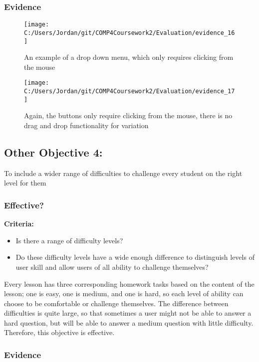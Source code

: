 \subsubsection{Evidence}

\begin{figure}[H]
	\texttt{[image: C:/Users/Jordan/git/COMP4Coursework2/Evaluation/evidence\_16]}
	\caption{An example of a drop down menu, which only requires clicking from the mouse}
\end{figure}

\begin{figure}[H]
	\texttt{[image: C:/Users/Jordan/git/COMP4Coursework2/Evaluation/evidence\_17]}
	\caption{Again, the buttons only require clicking from the mouse, there is no drag and drop functionality for variation}
\end{figure}

\subsection{Other Objective 4: }

To include a wider range of difficulties to challenge every student on the right level for them

\subsubsection{Effective?}

\textbf{Criteria: }

\begin{itemize}
	\item Is there a range of difficulty levels?
	\item Do these difficulty levels have a wide enough difference to distinguish levels of user skill and allow users of all ability to challenge themselves?
\end{itemize}

Every lesson has three corresponding homework tasks based on the content of the lesson; one is easy, one is medium, and one is hard, so each level of ability can choose to be comfortable or challenge themselves. The difference between difficulties is quite large, so that sometimes a user might not be able to answer a hard question, but will be able to answer a medium question with little difficulty. Therefore, this objective is effective.

\subsubsection{Evidence}

